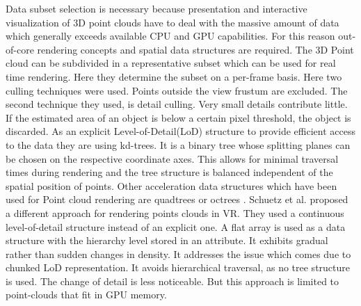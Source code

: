 \documentclass[10pt,twocolumn,letterpaper]{article}
\begin{document}
\setlength{\parindent}{1pc}Data subset selection is necessary because presentation and interactive visualization of 3D point clouds have to deal with the massive amount of data which generally exceeds available CPU and GPU capabilities. For this reason out-of-core rendering concepts and spatial data structures are required. The 3D Point cloud can be subdivided in a representative subset which can be used for real time rendering. Here they determine the subset on a per-frame basis. Here two culling techniques were used. Points outside the view frustum are excluded. The second technique they used, is detail culling. Very small details contribute little. If the estimated area of an object is below a certain pixel threshold, the object is discarded. As an explicit Level-of-Detail(LoD) structure to provide efficient access to the data they are using kd-trees. It is a binary tree whose splitting planes can be chosen on the respective coordinate axes. This allows for minimal traversal times during rendering and the tree structure is balanced independent of the spatial position of points. Other acceleration data structures which have been used for Point cloud rendering are quadtrees \cite{Gao:2014:VAL:2619648.2619672} or octrees \cite{kreylos2008immersive}. Schuetz et al. \cite{schuetz-2019-CLOD} proposed a different approach for rendering points clouds in VR. They used a continuous level-of-detail structure instead of an explicit one. A flat array is used as a data structure with the hierarchy level stored in an attribute. It exhibits gradual rather than sudden changes in density. It addresses the issue which comes due to chunked LoD representation. It avoids hierarchical traversal, as no tree structure is used. The change of detail is less noticeable. But this approach is limited to point-clouds that fit in GPU memory.
\end{document}
